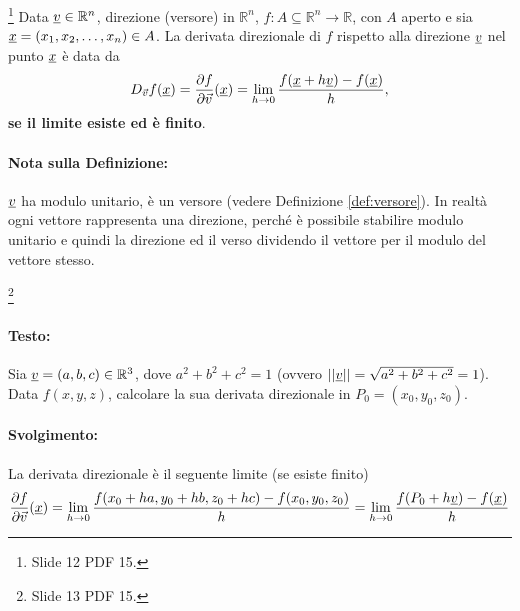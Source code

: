 \begin{definition}\footnote{Slide 12 PDF 15.}\label{def:derivata_direzionale_Rn_da_ricordare}
	Data $\uline v\in\mathbb{R}^n$, direzione (versore) in $\mathbb{R}^n$, $f:A\subseteq\mathbb R^n\rightarrow\mathbb R$, con $A$ aperto e sia $\uline x=(x_1,x_2,\hdots, x_n)\in A$. La derivata direzionale di $f$ rispetto alla direzione $\uline v$ nel punto $\uline x$ è data da
	\begin{equation*}
		D_{\vec{v}}f(\uline x) =\frac{\partial f}{\partial \vec{v}}(\uline x) = \lim\limits_{h\rightarrow 0}\frac{f(\uline x + h \uline v) - f(\uline x)}{h},
	\end{equation*}
	\textbf{se il limite esiste ed è finito}.
\end{definition}

\paragraph{Nota sulla Definizione:} $\uline v$ ha modulo unitario, è un versore (vedere Definizione \ref{def:versore}). In realtà ogni vettore rappresenta una direzione, perché è possibile stabilire modulo unitario e quindi la direzione ed il verso dividendo il vettore per il modulo del vettore stesso.

\begin{example}\footnote{Slide 13 PDF 15.}
	\paragraph{Testo:} Sia $\uline v=(a,b,c)\in\mathbb{R}^3$, dove $a^2+b^2+c^2=1$ (ovvero $||\uline v||=\sqrt{a^2+b^2+c^2}=1$). Data $f(x,y,z)$, calcolare la sua derivata direzionale in $P_0=(x_0,y_0,z_0)$.
	\paragraph{Svolgimento:} La derivata direzionale è il seguente limite (se esiste finito)
	\begin{equation*}
		\frac{\partial f}{\partial \vec{v}}(\uline x) = \lim\limits_{h\rightarrow 0}\frac{f(x_0+ha, y_0 + hb, z_0 + hc) - f(x_0,y_0,z_0)}{h} = \lim\limits_{h\rightarrow 0}\frac{f(P_0 + h \uline v) - f(\uline x)}{h}
	\end{equation*}
\end{example}

